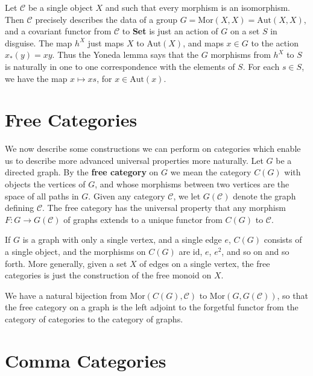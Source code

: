 \begin{example}
    Let $\mathcal{C}$ be a single object $X$ and such that every morphism is an isomorphism. Then $\mathcal{C}$ precisely describes the data of a group $G = \text{Mor}(X,X) = \text{Aut}(X,X)$, and a covariant functor from $\mathcal{C}$ to {\bf Set} is just an action of $G$ on a set $S$ in disguise. The map $h^X$ just maps $X$ to $\text{Aut}(X)$, and maps $x \in G$ to the action $x_*(y) = xy$. Thus the Yoneda lemma says that the $G$ morphisms from $h^X$ to $S$ is naturally in one to one correspondence with the elements of $S$. For each $s \in S$, we have the map $x \mapsto xs$, for $x \in \text{Aut}(x)$.
\end{example}

\section{Free Categories}

We now describe some constructions we can perform on categories which enable us to describe more advanced universal properties more naturally. Let $G$ be a directed graph. By the {\bf free category} on $G$ we mean the category $C(G)$ with objects the vertices of $G$, and whose morphisms between two vertices are the space of all paths in $G$. Given any category $\mathcal{C}$, we let $G(\mathcal{C})$ denote the graph defining $\mathcal{C}$. The free category has the universal property that any morphism $F: G \to G(\mathcal{C})$ of graphs extends to a unique functor from $C(G)$ to $\mathcal{C}$.

\begin{example}
    If $G$ is a graph with only a single vertex, and a single edge $e$, $C(G)$ consists of a single object, and the morphisms on $C(G)$ are $\text{id}$, $e$, $e^2$, and so on and so forth. More generally, given a set $X$ of edges on a single vertex, the free categories is just the construction of the free monoid on $X$.
\end{example}

We have a natural bijection from $\text{Mor}(C(G), \mathcal{C})$ to $\text{Mor}(G, G(\mathcal{C}))$, so that the free category on a graph is the left adjoint to the forgetful functor from the category of categories to the category of graphs.

\section{Comma Categories}

